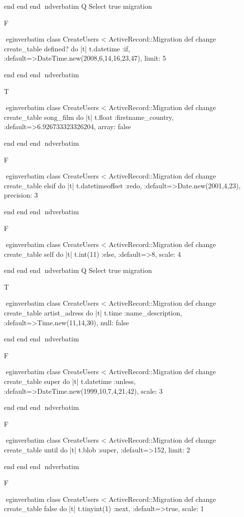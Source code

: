     end 
  end 
end
nd{verbatim}
Q
 Select true migration

F

egin{verbatim}
 class CreateUsers < ActiveRecord::Migration 
  def change 
    create_table defined? do |t| 
      t.datetime :if, :default=>DateTime.new(2008,6,14,16,23,47), limit: 5
    
    end 
  end 
end
nd{verbatim}

T

egin{verbatim}
 class CreateUsers < ActiveRecord::Migration 
  def change 
    create_table song_film do |t| 
      t.float :firstname_country, :default=>6.926733323326204, array: false
    
    end 
  end 
end
nd{verbatim}

F

egin{verbatim}
 class CreateUsers < ActiveRecord::Migration 
  def change 
    create_table elsif do |t| 
      t.datetimeoffset :redo, :default=>Date.new(2001,4,23), precision: 3
    
    end 
  end 
end
nd{verbatim}

F

egin{verbatim}
 class CreateUsers < ActiveRecord::Migration 
  def change 
    create_table self do |t| 
      t.int(11) :else, :default=>8, scale: 4
    
    end 
  end 
end
nd{verbatim}
Q
 Select true migration

T

egin{verbatim}
 class CreateUsers < ActiveRecord::Migration 
  def change 
    create_table artist_adress do |t| 
      t.time :name_description, :default=>Time.new(11,14,30), null: false
    
    end 
  end 
end
nd{verbatim}

F

egin{verbatim}
 class CreateUsers < ActiveRecord::Migration 
  def change 
    create_table super do |t| 
      t.datetime :unless, :default=>DateTime.new(1999,10,7,4,21,42), scale: 3
    
    end 
  end 
end
nd{verbatim}

F

egin{verbatim}
 class CreateUsers < ActiveRecord::Migration 
  def change 
    create_table until do |t| 
      t.blob :super, :default=>152, limit: 2
    
    end 
  end 
end
nd{verbatim}

F

egin{verbatim}
 class CreateUsers < ActiveRecord::Migration 
  def change 
    create_table false do |t| 
      t.tinyint(1) :next, :default=>true, scale: 1
    

